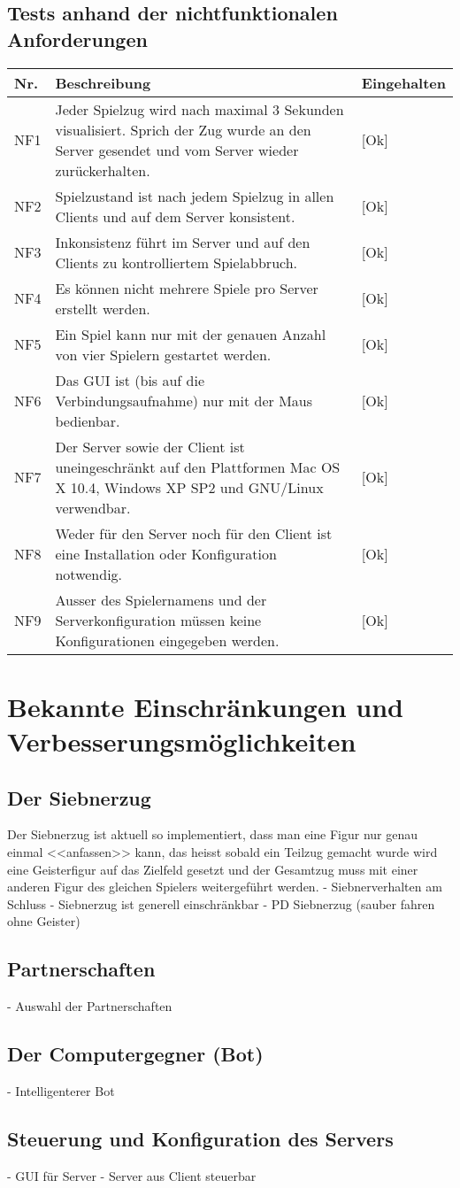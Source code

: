 \documentclass[12pt,halfparskip]{scrartcl}
\begin{document}
\subsection{Tests anhand der nichtfunktionalen Anforderungen}
	\begin {tabular}{l p{11cm} l}
		\toprule
		\textbf{Nr.} & \textbf{Beschreibung} & \textbf{Eingehalten} \\
		\midrule
		NF1 & Jeder Spielzug wird nach maximal 3 Sekunden visualisiert. Sprich der Zug wurde an den Server gesendet und vom Server wieder zurückerhalten. & [Ok] \\
		NF2 & Spielzustand ist nach jedem Spielzug in allen Clients und auf dem Server konsistent. & [Ok] \\
		NF3 & Inkonsistenz führt im Server und auf den Clients zu kontrolliertem Spielabbruch. & [Ok] \\
		NF4 & Es können nicht mehrere Spiele pro Server erstellt werden. & [Ok] \\
		NF5 & Ein Spiel kann nur mit der genauen Anzahl von vier Spielern gestartet werden. & [Ok] \\
		NF6 & Das GUI ist (bis auf die Verbindungsaufnahme) nur mit der Maus bedienbar. & [Ok] \\
		NF7 & Der Server sowie der Client ist uneingeschränkt auf den Plattformen Mac OS X 10.4, Windows XP SP2 und GNU/Linux verwendbar. & [Ok] \\
		NF8 & Weder für den Server noch für den Client ist eine Installation oder Konfiguration notwendig. & [Ok] \\
		NF9 & Ausser des Spielernamens und der Serverkonfiguration müssen keine Konfigurationen eingegeben werden. & [Ok] \\
		\bottomrule
	\end{tabular}
	
\section{Bekannte Einschränkungen und Verbesserungsmöglichkeiten}
\subsection{Der Siebnerzug}
Der Siebnerzug ist aktuell so implementiert, dass man eine Figur nur genau einmal <<anfassen>> kann, das heisst sobald ein Teilzug gemacht wurde wird eine Geisterfigur auf das Zielfeld gesetzt und der Gesamtzug muss mit einer anderen Figur des gleichen Spielers weitergeführt werden.
- Siebnerverhalten am Schluss 
- Siebnerzug ist generell einschränkbar
- PD Siebnerzug (sauber fahren ohne Geister)

\subsection{Partnerschaften}
- Auswahl der Partnerschaften

\subsection{Der Computergegner (Bot)}
- Intelligenterer Bot

\subsection{Steuerung und Konfiguration des Servers}
- GUI für Server
- Server aus Client steuerbar
\end{document}

